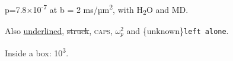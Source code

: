 p=7.8×10\textsuperscript{-7} at b = 2 ms/µm\textsuperscript{2}, with H\textsubscript{2}O and MD.

Also \ul{underlined}, \st{struck}, \textsc{caps}, \(\omega^2_p\) and \{unknown\}\texttt{left\ alone}.

\begin{tcolorbox}[colback=blue!5!white,colframe=blue!75!black,title={Note}]

Inside a box: 10\textsuperscript{3}.

\end{tcolorbox}
